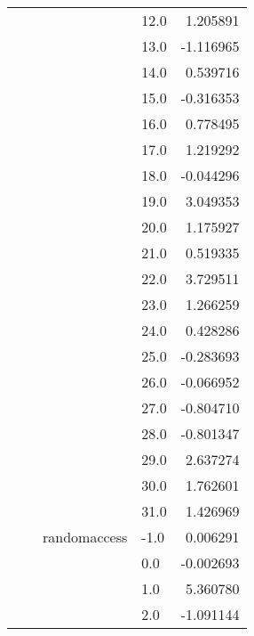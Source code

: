 \begin{tabular}{llllr}
                        &        &              &  12.0 &  1.205891 \\
                        &        &              &  13.0 & -1.116965 \\
                        &        &              &  14.0 &  0.539716 \\
                        &        &              &  15.0 & -0.316353 \\
                        &        &              &  16.0 &  0.778495 \\
                        &        &              &  17.0 &  1.219292 \\
                        &        &              &  18.0 & -0.044296 \\
                        &        &              &  19.0 &  3.049353 \\
                        &        &              &  20.0 &  1.175927 \\
                        &        &              &  21.0 &  0.519335 \\
                        &        &              &  22.0 &  3.729511 \\
                        &        &              &  23.0 &  1.266259 \\
                        &        &              &  24.0 &  0.428286 \\
                        &        &              &  25.0 & -0.283693 \\
                        &        &              &  26.0 & -0.066952 \\
                        &        &              &  27.0 & -0.804710 \\
                        &        &              &  28.0 & -0.801347 \\
                        &        &              &  29.0 &  2.637274 \\
                        &        &              &  30.0 &  1.762601 \\
                        &        &              &  31.0 &  1.426969 \\
                        &        & randomaccess & -1.0  &  0.006291 \\
                        &        &              &  0.0  & -0.002693 \\
                        &        &              &  1.0  &  5.360780 \\
                        &        &              &  2.0  & -1.091144 \\

\end{tabular}
